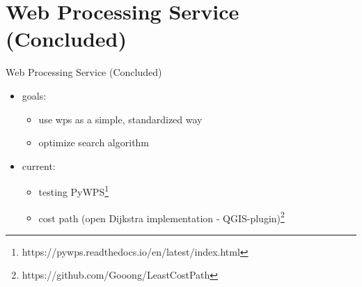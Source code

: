 \documentclass[usenames,dvipsnames,aspectratio=169]{beamer}
\begin{document}
	
	\section{Web Processing Service (Concluded)}
	\begin{frame}{Web Processing Service (Concluded)}
		\begin{itemize}
		\item goals: 
		\begin{itemize}
			\item use wps as a simple, standardized way
			\item optimize search algorithm
		\end{itemize}
		\item current: 
		\begin{itemize}
			\item testing PyWPS\footnote{https://pywps.readthedocs.io/en/latest/index.html}
			\item cost path (open Dijkstra implementation - QGIS-plugin)\footnote{https://github.com/Gooong/LeastCostPath}
		\end{itemize}
	\end{itemize}
	\end{frame}
	
\end{document}
